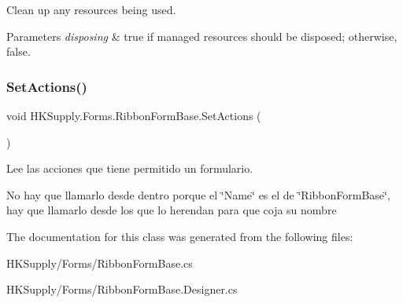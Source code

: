 Clean up any resources being used. 


\begin{DoxyParams}{Parameters}
{\em disposing} & true if managed resources should be disposed; otherwise, false.\\
\hline
\end{DoxyParams}
\mbox{\label{class_h_k_supply_1_1_forms_1_1_ribbon_form_base_a3e00a9c3ea88e57573dd6cfb730f0906}} 
\subsubsection{\texorpdfstring{Set\+Actions()}{SetActions()}}
{\footnotesize\ttfamily void H\+K\+Supply.\+Forms.\+Ribbon\+Form\+Base.\+Set\+Actions (\begin{DoxyParamCaption}{ }\end{DoxyParamCaption})}



Lee las acciones que tiene permitido un formulario. 

No hay que llamarlo desde dentro porque el \char`\"{}\+Name\char`\"{} es el de \char`\"{}\+Ribbon\+Form\+Base\char`\"{}, hay que llamarlo desde los que lo herendan para que coja su nombre 

The documentation for this class was generated from the following files\+:\begin{DoxyCompactItemize}
\item 
H\+K\+Supply/\+Forms/Ribbon\+Form\+Base.\+cs\item 
H\+K\+Supply/\+Forms/Ribbon\+Form\+Base.\+Designer.\+cs\end{DoxyCompactItemize}
